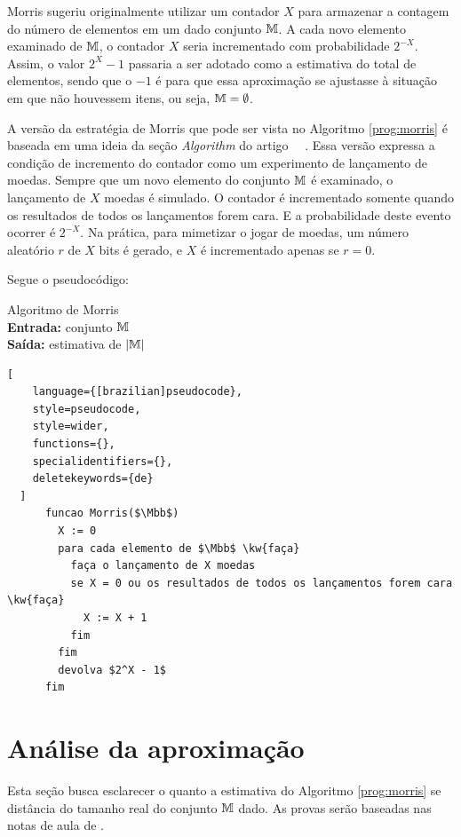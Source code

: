 Morris sugeriu originalmente utilizar um contador $X$ para armazenar a contagem do número de elementos em um dado conjunto $\mathbb{M}$.
A cada novo elemento examinado de $\mathbb{M}$, o contador $X$ seria incrementado com probabilidade $2^{-X}$.
Assim, o valor $2^{X} - 1$ passaria a ser adotado como a estimativa do total de elementos, 
sendo que o $-1$ é para que essa aproximação se ajustasse à situação em que não houvessem itens, ou seja, $\mathbb{M} = \emptyset$.

A versão da estratégia de Morris que pode ser vista no Algoritmo \ref{prog:morris}
é baseada em uma ideia da seção \textit{Algorithm} do artigo ~~\citep{ApproximateCountingAlgorithm}.
Essa versão expressa a condição de incremento do contador como um experimento de lançamento de moedas. 
Sempre que um novo elemento do conjunto $\mathbb{M}$ é examinado, o lançamento de $X$ moedas é simulado. 
O contador é incrementado somente quando os resultados de todos os lançamentos forem cara.
E a probabilidade deste evento ocorrer é $2^{-X}$. Na prática, para mimetizar o jogar de moedas, 
um número aleatório $r$ de $X$ bits é gerado, e $X$ é incrementado apenas se $r = 0$.

Segue o pseudocódigo:
\begin{programruledcaption}{
Algoritmo de Morris\label{prog:morris}
\\ \textbf{Entrada:} conjunto $\mathbb{M}$
\\ \textbf{Saída:} estimativa de $|\mathbb{M}|$
\label{prog:flajolet-martin}
}
  \begin{lstlisting}[
    language={[brazilian]pseudocode},
    style=pseudocode,
    style=wider,
    functions={},
    specialidentifiers={},
    deletekeywords={de}
  ]
      funcao Morris($\Mbb$) 
        X := 0
        para cada elemento de $\Mbb$ \kw{faça}
          faça o lançamento de X moedas
          se X = 0 ou os resultados de todos os lançamentos forem cara \kw{faça}
            X := X + 1
          fim
        fim
        devolva $2^X - 1$
      fim
  \end{lstlisting}
\end{programruledcaption}

\section{Análise da aproximação}
\label{sec:morris:analysis}

Esta seção busca esclarecer o quanto a estimativa do Algoritmo \ref{prog:morris} se distância do tamanho real do conjunto $\mathbb{M}$ dado. As provas
serão baseadas nas notas de aula de \citep{LectureNotesAndoni}.

